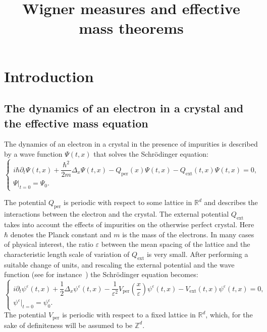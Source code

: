 \documentclass[AHL,Unicode,longabstracts]{cedram}
\title[Wigner measures and effective mass theorems]{Wigner measures and effective mass theorems}
\author{\firstname{Victor} \lastname{Chabu}}
\author{\firstname{Clotilde} \lastname{Fermanian Kammerer}}
\author{\firstname{Fabricio} \lastname{Macià}}
\DeclareMathOperator{\ext}{ext}
\DeclareMathOperator{\per}{per}
\newcommand*\R{{\mathbb R}}
\newcommand*\Z{{\mathbb Z}}
\newcommand*\eps{\varepsilon}
\numberwithin{equation}{section}
\begin{document}
\maketitle

\section{Introduction}

\subsection{The dynamics of an electron in a crystal and the effective mass equation}
The dynamics of an electron in a crystal in the presence of impurities is described by a wave function $\Psi(t,x)$ that solves the Schr\"odinger equation:
\begin{equation}\label{eq:schrodbrut}
\begin{cases}
i\hbar\partial_t \Psi(t,x) +\dfrac{\hbar^2}{2m} \Delta_x \Psi(t,x) - Q_{\per}\left(x\right)\Psi(t,x) - Q_{\ext}(t,x)\Psi(t,x) =0,\\
\Psi |_{t=0}=\Psi_0.
\end{cases}
\end{equation}

The potential $Q_{\per}$ is periodic with respect to some lattice in $\R^d$ and describes the interactions between the electron and the crystal. The external potential $Q_{\ext}$ takes into account the effects of impurities on the otherwise perfect crystal. Here $\hbar$ denotes the Planck constant and $m$ is the mass of the electrons. In many cases of physical interest, the ratio $\eps$ between the mean spacing of the lattice and the characteristic length scale of variation of $Q_{\ext}$ is very small. After performing a suitable change of units, and rescaling the external potential and the wave function (see for instance~\cite{PR96}) the Schr\"odinger equation becomes:
\begin{equation}\label{eq:schro}
\begin{cases}
i\partial_t \psi^\eps (t,x)+\dfrac{1}{2} \Delta_x \psi^\eps(t,x) - \dfrac{1}{\eps^{2}} V_{\per}\left(\dfrac{x}{\eps}\right)\psi^\eps(t,x) - V_{\ext}(t,x)\psi^\eps(t,x) =0,\\
\psi^\eps |_{t=0}=\psi^\eps_0.
\end{cases}
\end{equation}
The potential $V_{\per}$ is periodic with respect to a fixed lattice in $\R^d$, which, for the sake of definiteness will be assumed to be $\Z^d$.
\end{document}
